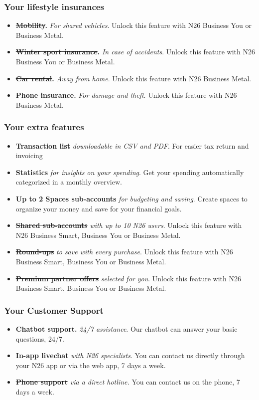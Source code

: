 \documentclass[onsided]{book}
\numberwithin{equation}{section}
\begin{document}
\subsubsection{Your lifestyle insurances}
\begin{itemize}
    \item \textbf{\st{Mobility}.} \textit{For shared vehicles}. Unlock this feature with N26 Business You or Business Metal.
    \item \textbf{\st{Winter sport insurance}.} \textit{In case of accidents}. Unlock this feature with N26 Business You or Business Metal.
    \item \textbf{\st{Car rental}.} \textit{Away from home}. Unlock this feature with N26 Business Metal.
    \item \textbf{\st{Phone insurance}.} \textit{For damage and theft}. Unlock this feature with N26 Business Metal.
\end{itemize}

\subsubsection{Your extra features}
\begin{itemize}
    \item \textbf{Transaction list} \textit{downloadable in CSV and PDF}. For easier tax return and invoicing
    \item \textbf{Statistics} \textit{for insights on your spending}. Get your spending automatically categorized in a monthly overview.
    \item \textbf{Up to 2 Spaces sub-accounts} \textit{for budgeting and saving}. Create spaces to organize your money and save for your financial goals.
    \item \textbf{\st{Shared sub-accounts}} \textit{with up to 10 N26 users}. Unlock this feature with N26 Business Smart, Business You or Business Metal.
    \item \textbf{\st{Round-ups}} \textit{to save with every purchase}. Unlock this feature with N26 Business Smart, Business You or Business Metal.
    \item \textbf{\st{Premium partner offers}} \textit{selected for you}. Unlock this feature with N26 Business Smart, Business You or Business Metal.
\end{itemize}

\subsubsection{Your Customer Support}
\begin{itemize}
    \item \textbf{Chatbot support.} \textit{24/7 assistance}. Our chatbot can answer your basic questions, 24/7.
    \item \textbf{In-app livechat} \textit{with N26 specialists}.  You can contact us directly through your N26 app or via the web app, 7 days a week.
    \item \textbf{\st{Phone support}} \textit{via a direct hotline.} You can contact us on the phone, 7 days a week.
\end{itemize}
\end{document}
